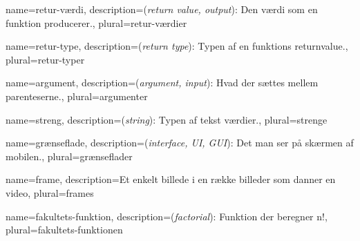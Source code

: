 \usepackage[toc]{glossaries}

\makeglossaries

{
	name={retur-værdi},
	description={(\textit{return value, output}): Den værdi som en funktion
				 producerer.},
	plural={retur-værdier}
}

{
	name={retur-type},
	description={(\textit{return type}): Typen af en funktions
				 \gls{returnvalue}.},
	plural={retur-typer}
}

{
	name={argument},
	description={(\textit{argument, input}): Hvad der sættes mellem
				 parenteserne.},
	plural={argumenter}
}

{
	name={streng},
	description={(\textit{string}): Typen af tekst værdier.},
	plural={strenge}
}

{
	name={grænseflade},
	description={(\textit{interface, UI, GUI}): Det man ser på skærmen af
		 		 mobilen.},
	plural={grænseflader}
}

{
	name={frame},
	description={Et enkelt billede i en række billeder som danner en video},
	plural={frames}
}

{
	name={fakultets-funktion},
	description={(\textit{factorial}): Funktion der beregner n!},
	plural={fakultets-funktionen}
}

